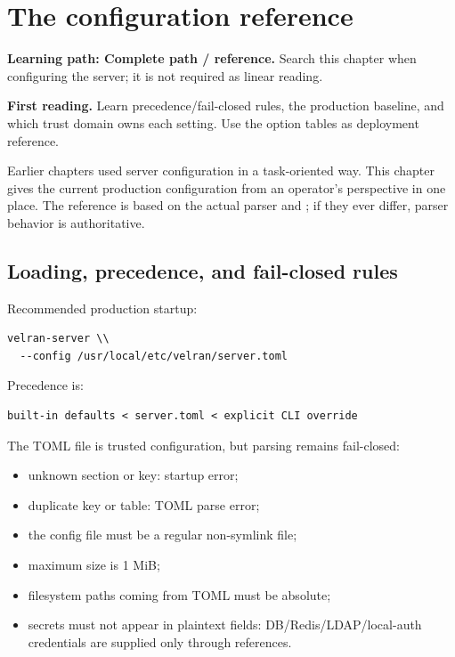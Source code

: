 \chapter{The  configuration reference}

\noindent\textbf{Learning path: Complete path / reference.} Search this chapter when configuring the server; it is not required as linear reading.\par\medskip

\noindent\textbf{First reading.} Learn precedence/fail-closed rules, the production baseline, and which trust domain owns each setting. Use the option tables as deployment reference.\par\medskip

Earlier chapters used server configuration in a task-oriented way. This chapter gives the current production configuration from an operator's perspective in one place. The reference is based on the actual parser and ; if they ever differ, parser behavior is authoritative.

\section{Loading, precedence, and fail-closed rules}

Recommended production startup:

\begin{lstlisting}
velran-server \\
  --config /usr/local/etc/velran/server.toml
\end{lstlisting}

Precedence is:

\begin{lstlisting}
built-in defaults < server.toml < explicit CLI override
\end{lstlisting}

The TOML file is trusted configuration, but parsing remains fail-closed:

\begin{itemize}
  \item unknown section or key: startup error;
  \item duplicate key or table: TOML parse error;
  \item the config file must be a regular non-symlink file;
  \item maximum size is 1 MiB;
  \item filesystem paths coming from TOML must be absolute;
  \item secrets must not appear in plaintext fields: DB/Redis/LDAP/local-auth credentials are supplied only through  references.
\end{itemize}

